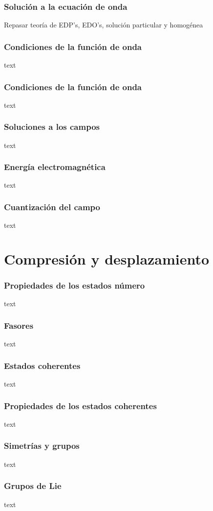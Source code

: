 \documentclass[xcolor=dvipsnames,slidestop,compress,mathserif, 11pt]{beamer}
\begin{document}
\begin{frame}[c]
	\frametitle{Solución a la ecuación de onda}
	Repasar teoría de EDP's, EDO's, solución particular y homogénea
\end{frame}

\begin{frame}[c]
	\frametitle{Condiciones de la función de onda}
	text
\end{frame}

\begin{frame}[c]
	\frametitle{Condiciones de la función de onda}
	text
\end{frame}

\begin{frame}[c]
	\frametitle{Soluciones a los campos}
	text
\end{frame}

\begin{frame}[c]
	\frametitle{Energía electromagnética}
	text
\end{frame}

\begin{frame}[c]
	\frametitle{Cuantización del campo}
	text
\end{frame}

\section{Compresión y desplazamiento}

\begin{frame}[c]
	\frametitle{Propiedades de los estados número}
	text
\end{frame}

\begin{frame}[c]
	\frametitle{Fasores}
	text
\end{frame}

\begin{frame}[c]
	\frametitle{Estados coherentes}
	text
\end{frame}

\begin{frame}[c]
	\frametitle{Propiedades de los estados coherentes}
	text
\end{frame}

\begin{frame}[c]
	\frametitle{Simetrías y grupos}
	text
\end{frame}

\begin{frame}[c]
	\frametitle{Grupos de Lie}
	text
\end{frame}
\end{document}
